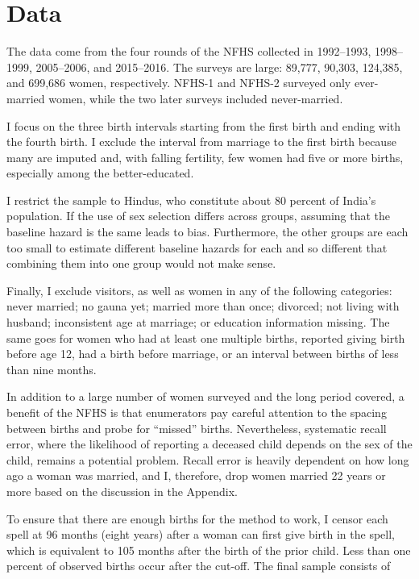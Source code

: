 \documentclass[12pt,letterpaper]{article}
\begin{document}
\section{Data\label{sec:data}}

The data come from the four rounds of the NFHS
collected in 1992--1993, 1998--1999, 2005--2006, and 2015--2016.
The surveys are large: 89,777, 90,303, 124,385, and 699,686 women, respectively. 
NFHS-1 and NFHS-2 surveyed only ever-married women, while the two later surveys included 
never-married.

I focus on the three birth intervals starting from the first birth and ending with the 
fourth birth.
I exclude the interval from marriage to the first birth because many are imputed and,
with falling fertility, few women had five or more births, especially among the 
better-educated.

I restrict the sample to Hindus, who constitute about 80 percent of India’s population.
If the use of sex selection differs across groups, assuming that the
baseline hazard is the same leads to bias. 
Furthermore, the other groups are each too small to estimate different
baseline hazards for each and so different that combining them into one
group would not make sense.

Finally, I exclude visitors, as well as women in any of the following 
categories: never married; no gauna yet; married more than once; divorced; 
not living with husband; inconsistent age at marriage; or education information missing.  
The same goes for women who had at least one multiple births, reported giving birth 
before age 12, had a birth before marriage, or an interval between births of less than 
nine months. 

In addition to a large number of women surveyed and the long period covered, a
benefit of the NFHS is that enumerators pay careful attention to the spacing 
between births and probe for ``missed'' births.
Nevertheless, systematic recall error, where the likelihood of reporting a deceased 
child depends on the sex of the child, remains a potential problem.
Recall error is heavily dependent on how long ago a woman was married, and I, therefore, 
drop women married 22 years or more based on the discussion in the Appendix.

To ensure that there are enough births for the method to work, I censor each spell at 96 
months (eight years) after a woman can first give birth in the spell, which is equivalent 
to 105 months after the birth of the prior child.
Less than one percent of observed births occur after the cut-off.
The final sample consists of 

\end{document}
